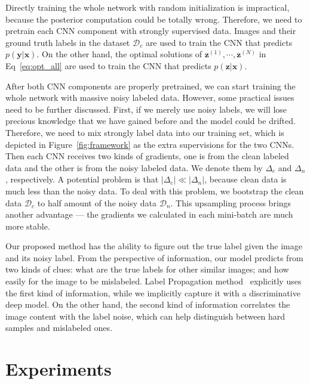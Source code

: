 \documentclass[10pt,twocolumn,letterpaper]{article}
\def\vec{\mathbf}
\begin{document}
Directly training the whole network with random initialization is impractical, because the posterior computation could be totally wrong. Therefore, we need to pretrain each CNN component with strongly supervised data. Images and their ground truth labels in the dataset $\mathcal{D}_c$ are used to train the CNN that predicts $p(\vec{y}|\vec{x})$. On the other hand, the optimal solutions of $\vec{z}^{(1)},\cdots,\vec{z}^{(N)}$ in Eq~\eqref{eq:opt_all} are used to train the CNN that predicts $p(\vec{z}|\vec{x})$.

After both CNN components are properly pretrained, we can start training the whole network with massive noisy labeled data. However, some practical issues need to be further discussed. First, if we merely use noisy labels, we will lose precious knowledge that we have gained before and the model could be drifted. Therefore, we need to mix strongly label data into our training set, which is depicted in Figure~\ref{fig:framework} as the extra supervisions for the two CNNs. Then each CNN receives two kinds of gradients, one is from the clean labeled data and the other is from the noisy labeled data. We denote them by $\Delta_c$ and $\Delta_n$, respectively. A potential problem is that $|\Delta_c| \ll |\Delta_n|$, because clean data is much less than the noisy data. To deal with this problem, we bootstrap the clean data $\mathcal{D}_c$ to half amount of the noisy data $\mathcal{D}_n$. This upsampling process brings another advantage --- the gradients we calculated in each mini-batch are much more stable.

Our proposed method has the ability to figure out the true label given the image and its noisy label. From the perspective of information, our model predicts from two kinds of clues: what are the true labels for other similar images; and how easily for the image to be mislabeled. Label Propagation method~\cite{zhu2002learning} explicitly uses the first kind of information, while we implicitly capture it with a discriminative deep model. On the other hand, the second kind of information correlates the image content with the label noise, which can help distinguish between hard samples and mislabeled ones.

\section{Experiments} %
\label{sec:experiments}
\end{document}
